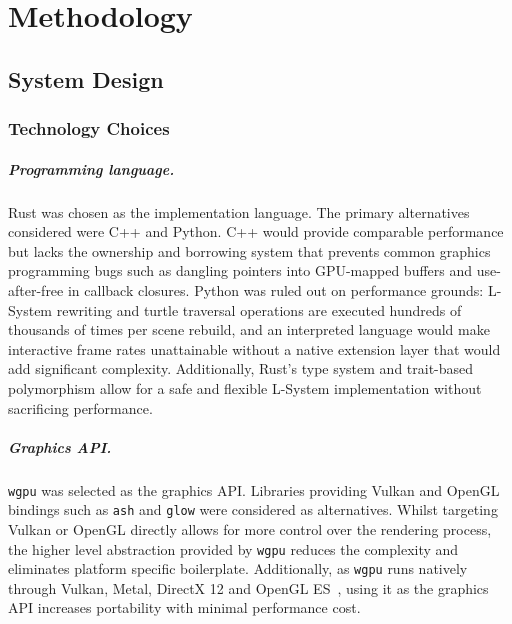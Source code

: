 \chapter{Methodology}
\label{chapter2}

\section{System Design}

\subsection{Technology Choices}

\paragraph{Programming language.}
Rust was chosen as the implementation language. The primary alternatives considered were C++ and Python. C++
would provide comparable performance but lacks the ownership and borrowing system that prevents common
graphics programming bugs such as dangling pointers into GPU-mapped buffers and use-after-free in callback
closures. Python was ruled out on performance grounds: L-System rewriting and turtle traversal operations are
executed hundreds of thousands of times per scene rebuild, and an interpreted language would make interactive
frame rates unattainable without a native extension layer that would add significant complexity.
Additionally, Rust's type system and trait-based polymorphism allow for a safe and flexible L-System
implementation without sacrificing performance.

\paragraph{Graphics API.}
\texttt{wgpu} was selected as the graphics API. Libraries providing Vulkan and OpenGL bindings such as
\texttt{ash} and \texttt{glow} were considered as alternatives. Whilst targeting Vulkan or OpenGL directly
allows for more control over the rendering process, the higher level abstraction provided by \texttt{wgpu}
reduces the complexity and eliminates platform specific boilerplate. Additionally, as \texttt{wgpu} runs
natively through Vulkan, Metal, DirectX 12 and OpenGL ES~\cite{WgpuPortableGraphics}, using it as the
graphics API increases portability with minimal performance cost.

